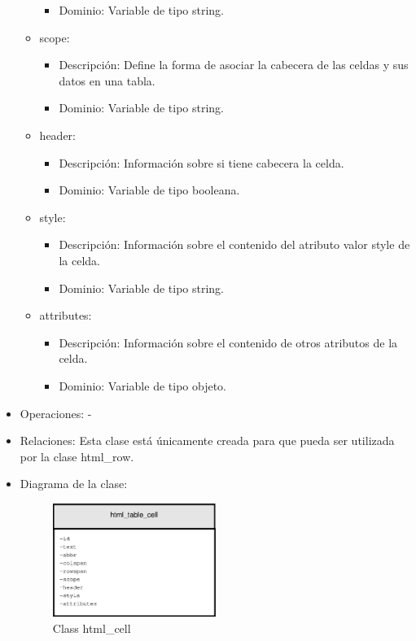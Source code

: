 \begin{itemize}
\begin{itemize}
\begin{itemize}
					\item Dominio: Variable de tipo string.
				\end{itemize}
		\end{itemize}
		\begin{itemize}
			\item scope:
				\begin{itemize}
					\item Descripción: Define la forma de asociar la cabecera de las celdas y sus datos en una tabla.
					\item Dominio: Variable de tipo string.
				\end{itemize}
		\end{itemize}
		\begin{itemize}
			\item header:
				\begin{itemize}
					\item Descripción: Información sobre si tiene cabecera la celda.
					\item Dominio: Variable de tipo booleana.
				\end{itemize}
		\end{itemize}
		\begin{itemize}
			\item style:
				\begin{itemize}
					\item Descripción: Información sobre el contenido del atributo valor style de la celda.
					\item Dominio: Variable de tipo string.
				\end{itemize}
		\end{itemize}
		\begin{itemize}
			\item attributes:
				\begin{itemize}
					\item Descripción: Información sobre el contenido de otros atributos de la celda.
					\item Dominio: Variable de tipo objeto.
				\end{itemize}
		\end{itemize}
	\item Operaciones: -
	\item Relaciones: Esta clase está únicamente creada para que pueda ser utilizada por la clase html\_row.
	\newpage
	\item Diagrama de la clase:
		\begin{figure}[h]
			\centering
			\includegraphics[width=0.5\textwidth]{./img/html_table_cell.eps}
			\caption{Class html\_cell}
		\end{figure}
\end{itemize}

